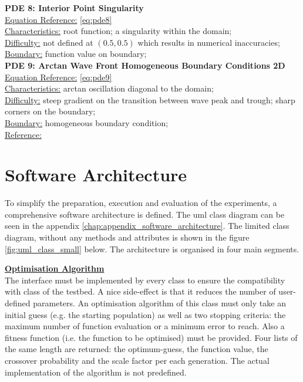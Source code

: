 \documentclass[./\jobname.tex]{subfiles}
\begin{document}
\textbf{PDE 8: Interior Point Singularity} \\
\underline{Equation Reference:} \eqref{eq:pde8} \\
\underline{Characteristics:} root function; a singularity within the domain; \\
\underline{Difficulty:} not defined at $(0.5, 0.5)$ which results in numerical inaccuracies; \\
\underline{Boundary:} function value on boundary; \\

\textbf{PDE 9: Arctan Wave Front Homogeneous Boundary Conditions 2D} \\
\underline{Equation Reference:} \eqref{eq:pde9} \\
\underline{Characteristics:} arctan oscillation diagonal to the domain;  \\
\underline{Difficulty:} steep gradient on the transition between wave peak and trough; sharp corners on the boundary; \\
\underline{Boundary:} homogeneous boundary condition; \\
\underline{Reference:} \cite{mitchell_nist_2018} \\


\section{Software Architecture}
\label{chap:software_architecutre}

To simplify the preparation, execution and evaluation of the experiments, a comprehensive software architecture is defined. The \gls{uml} class diagram can be seen in the appendix \ref{chap:appendix_software_architecture}. The limited class diagram, without any methods and attributes is shown in the figure \ref{fig:uml_class_small} below. The architecture is organised in four main segments. 

\large \underline{\textbf{Optimisation Algorithm}} \\
The  interface must be implemented by every  class to ensure the compatibility with  class of the testbed. A nice side-effect is that it reduces the number of user-defined parameters. An optimisation algorithm of this class must only take an initial guess (e.g. the starting population) as well as two stopping criteria: the maximum number of function evaluation or a minimum error to reach. Also a fitness function (i.e. the function to be optimised) must be provided. Four lists of the same length are returned: the optimum-guess, the function value, the crossover probability and the scale factor per each generation. The actual implementation of the algorithm is not predefined. 
\end{document}
